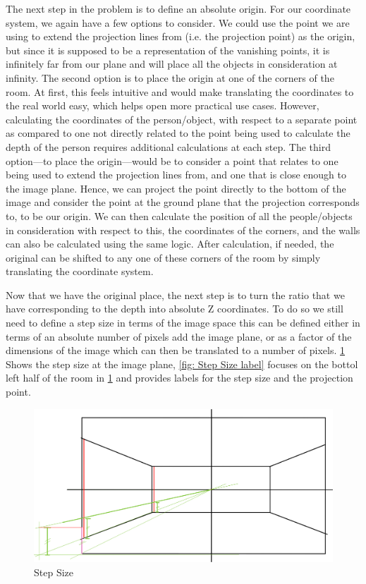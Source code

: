 The next step in the problem is to define an absolute origin. For our coordinate system, we again have a few options to consider. We could use the point we are using to extend the projection lines from (i.e. the projection point) as the origin, but since it is supposed to be a representation of the vanishing points, it is infinitely far from our plane and will place all the objects in consideration at infinity. The second option is to place the origin at one of the corners of the room. At first, this feels intuitive and would make translating the coordinates to the real world easy, which helps open more practical use cases. However, calculating the coordinates of the person/object, with respect to a separate point as compared to one not directly related to the point being used to calculate the depth of the person requires additional calculations at each step. The third option—to place the origin—would be to consider a point that relates to one being used to extend the projection lines from, and one that is close enough to the image plane. Hence, we can project the point directly to the bottom of the image and consider the point at the ground plane that the projection corresponds to, to be our origin. We can then calculate the position of all the people/objects in consideration with respect to this, the coordinates of the corners, and the walls can also be calculated using the same logic. After calculation, if needed, the original can be shifted to any one of these corners of the room by simply translating the coordinate system.\newline

Now that we have the original place, the next step is to turn the ratio that we have corresponding to the depth into absolute Z coordinates. To do so we still need to define a step size in terms of the image space this can be defined either in terms of an absolute number of pixels add the image plane, or as a factor of the dimensions of the image which can then be translated to a number of pixels. \ref{fig:Step Size} Shows the step size at the image plane, \ref{fig: Step Size label} focuses on the bottol left half of the room in \ref{fig:Step Size} and provides labels for the step size and the projection point.\newline

\begin{figure}[H]
    \centering
    \includegraphics[width=1.0\textwidth]{Calculations5.jpeg}
    \caption{Step Size}
    \label{fig:Step Size}
\end{figure}

